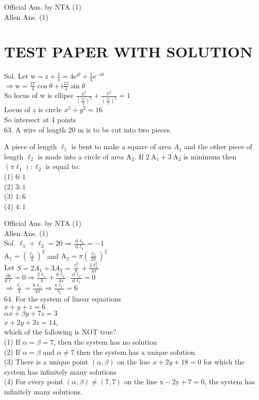 \documentclass[10pt]{article}
\begin{document}
Official Ans. by NTA (1)\\
Allen Ans. (1)

\section*{TEST PAPER WITH SOLUTION}
Sol. Let \(\mathrm{w}=\mathrm{z}+\frac{1}{\mathrm{z}}=4 \mathrm{e}^{\mathrm{i} \theta}+\frac{1}{4} \mathrm{e}^{-\mathrm{i} \theta}\)\\
\(\Rightarrow \mathrm{w}=\frac{17}{4} \cos \theta+\mathrm{i} \frac{15}{4} \sin \theta\)\\
So locus of w is ellipse \(\frac{\mathrm{x}^{2}}{\left(\frac{17}{4}\right)^{2}}+\frac{\mathrm{y}^{2}}{\left(\frac{15}{4}\right)^{2}}=1\)\\
Locus of \(z\) is circle \(x^{2}+y^{2}=16\)\\
So intersect at 4 points\\
63. A wire of length 20 m is to be cut into two pieces.

A piece of length \(\ell_{1}\) is bent to make a square of area \(A_{1}\) and the other piece of length \(\ell_{2}\) is made into a circle of area \(\mathrm{A}_{2}\). If \(2 \mathrm{~A}_{1}+3 \mathrm{~A}_{2}\) is minimum then \(\left(\pi \ell_{1}\right): \ell_{2}\) is equal to:\\
(1) \(6: 1\)\\
(2) \(3: 1\)\\
(3) \(1: 6\)\\
(4) \(4: 1\)

Official Ans. by NTA (1)\\
Allen Ans. (1)\\
Sol. \(\ell_{1}+\ell_{2}=20 \Rightarrow \frac{\mathrm{~d} \ell_{2}}{\mathrm{~d} \ell_{1}}=-1\)\\
\(\mathrm{A}_{1}=\left(\frac{\ell_{1}}{4}\right)^{2}\) and \(\mathrm{A}_{2}=\pi\left(\frac{\ell_{2}}{2 \pi}\right)^{2}\)\\
Let \(S=2 A_{1}+3 A_{2}=\frac{\ell_{1}^{2}}{8}+\frac{3 \ell_{2}^{2}}{4 \pi}\)\\
\(\frac{\mathrm{ds}}{\mathrm{d} \ell}=0 \Rightarrow \frac{2 \ell_{1}}{8}+\frac{6 \ell_{2}}{4 \pi} \cdot \frac{\mathrm{~d} \ell_{2}}{\mathrm{~d} \ell_{1}}=0\)\\
\(\Rightarrow \frac{\ell_{1}}{4}=\frac{6 \ell_{2}}{4 \pi} \Rightarrow \frac{\pi \ell_{1}}{\ell_{2}}=6\)\\
64. For the system of linear equations\\
\(x+y+z=6\)\\
\(\alpha x+\beta y+7 z=3\)\\
\(x+2 y+3 z=14\),\\
which of the following is NOT true?\\
(1) If \(\alpha=\beta=7\), then the system has no solution\\
(2) If \(\alpha=\beta\) and \(\alpha \neq 7\) then the system has a unique solution.\\
(3) There is a unique point \((\alpha, \beta)\) on the line \(x+2 y+18=0\) for which the system has infinitely many solutions\\
(4) For every point \((\alpha, \beta) \neq(7,7)\) on the line \(\mathrm{x}-2 \mathrm{y}+7=0\), the system has infinitely many solutions.
\end{document}
